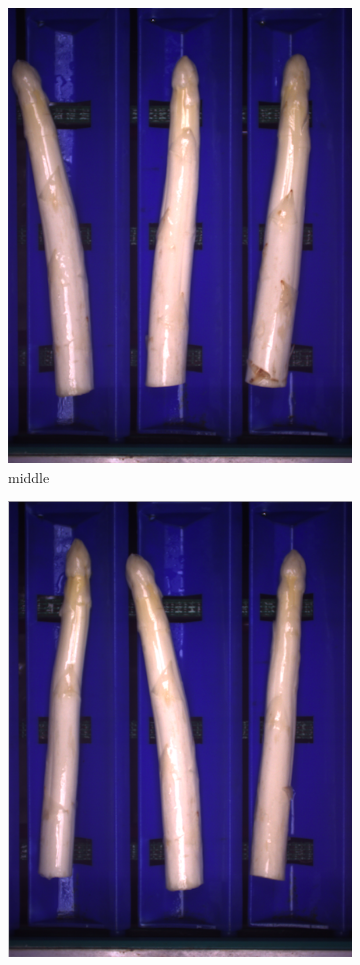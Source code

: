 \begin{figure}[h]
\begin{subfigure}{0.3\textwidth}
		\includegraphics[width=0.95\linewidth]{Figures/chapter02/anna_b.png}
		\caption{middle}
	\end{subfigure}
	\begin{subfigure}{0.3\textwidth}
		\includegraphics[width=0.95\linewidth]{Figures/chapter02/anna_c.png}

\end{subfigure}
\end{figure}
